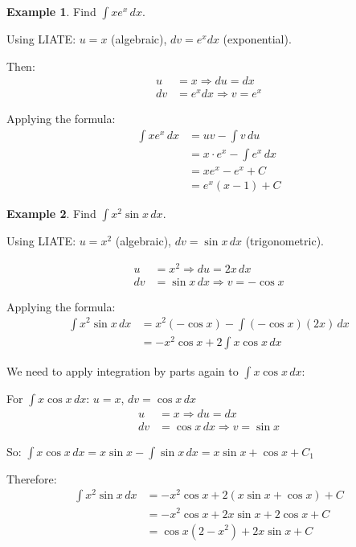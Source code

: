 \documentclass[12pt,a4paper]{book}
\theoremstyle{definition}
\newtheorem{example}{Example}[chapter]
\begin{document}
\begin{example}
Find $\int x e^x \, dx$.

Using LIATE: $u = x$ (algebraic), $dv = e^x dx$ (exponential).

Then:
\begin{align}
u &= x \Rightarrow du = dx\\
dv &= e^x dx \Rightarrow v = e^x
\end{align}

Applying the formula:
\begin{align}
\int x e^x \, dx &= uv - \int v \, du\\
&= x \cdot e^x - \int e^x \, dx\\
&= xe^x - e^x + C\\
&= e^x(x - 1) + C
\end{align}
\end{example}

\begin{example}
Find $\int x^2 \sin x \, dx$.

Using LIATE: $u = x^2$ (algebraic), $dv = \sin x \, dx$ (trigonometric).

\begin{align}
u &= x^2 \Rightarrow du = 2x \, dx\\
dv &= \sin x \, dx \Rightarrow v = -\cos x
\end{align}

Applying the formula:
\begin{align}
\int x^2 \sin x \, dx &= x^2(-\cos x) - \int (-\cos x)(2x) \, dx\\
&= -x^2 \cos x + 2\int x \cos x \, dx
\end{align}

We need to apply integration by parts again to $\int x \cos x \, dx$:

For $\int x \cos x \, dx$: $u = x$, $dv = \cos x \, dx$
\begin{align}
u &= x \Rightarrow du = dx\\
dv &= \cos x \, dx \Rightarrow v = \sin x
\end{align}

So: $\int x \cos x \, dx = x \sin x - \int \sin x \, dx = x \sin x + \cos x + C_1$

Therefore:
\begin{align}
\int x^2 \sin x \, dx &= -x^2 \cos x + 2(x \sin x + \cos x) + C\\
&= -x^2 \cos x + 2x \sin x + 2\cos x + C\\
&= \cos x(2 - x^2) + 2x \sin x + C
\end{align}
\end{example}
\end{document}
